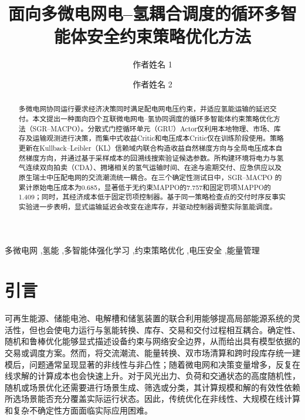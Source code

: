 \documentclass[final,5p,times]{elsarticle}
\newcommand{\method}{SGR--MACPO\xspace}
\begin{document}
\begin{frontmatter}

\title{面向多微电网电--氢耦合调度的循环多智能体安全约束策略优化方法}

\author[inst1]{作者姓名 1}
\author[inst1]{作者姓名 2}
\address[inst1]{某单位电气工程系，城市，国家}

\begin{abstract}
多微电网协同运行要求经济决策同时满足配电网电压约束，并适应氢能运输的延迟交付。本文提出一种面向四个互联微电网电--氢协同调度的循环多智能体约束策略优化方法（\method）。分散式门控循环单元（GRU）Actor仅利用本地物理、市场、库存及运输观测进行决策，而集中式收益Critic和电压成本Critic仅在训练阶段使用。策略更新在Kullback--Leibler（KL）信赖域内联合构造收益自然梯度方向与全局电压成本自然梯度方向，并通过基于采样成本的回溯线搜索验证候选参数。所构建环境将电力与氢气连续双向拍卖（CDA）、拥堵相关的氢气运输时间、在途与逾期交付、应急供应以及原生瑞士中压配电网的交流潮流统一耦合。在三个确定性测试日中，\method 的累计原始电压成本为0.685，显著低于无约束MAPPO的7.757和固定罚项MAPPO的1.409；同时，其经济成本低于固定罚项控制器。基于同一策略检查点的交付时序反事实实验进一步表明，显式运输延迟会改变在途库存，并驱动控制器调整实际氢能调度。
\end{abstract}

\begin{keyword}
多微电网 \sep 氢能 \sep 多智能体强化学习 \sep 约束策略优化 \sep 电压安全 \sep 能量管理
\end{keyword}

\end{frontmatter}

\section{引言}
\label{sec:intro}

可再生能源、储能电池、电解槽和储氢装置的联合利用能够提高局部能源系统的灵活性，但也会使电力运行与氢能转换、库存、交易和交付过程相互耦合\cite{yue2021hydrogen,staffell2019hydrogen,parra2019hydrogen,li2023hierarchical}。确定性、随机和鲁棒优化能够显式描述设备约束与网络安全边界，从而给出具有模型依据的交易或调度方案。然而，将交流潮流、能量转换、双市场清算和跨时段库存统一建模后，问题通常呈现显著的非线性与非凸性；随着微电网和决策变量增多，反复在线求解的计算成本也会快速上升。对于风光出力、负荷和交通状态的高度随机性，随机或场景优化还需要进行场景生成、筛选或分类，其计算规模和解的有效性依赖所选场景能否充分覆盖实际运行状态。因此，传统优化在非线性、大规模在线计算和复杂不确定性方面面临实际应用困难。
\end{document}
